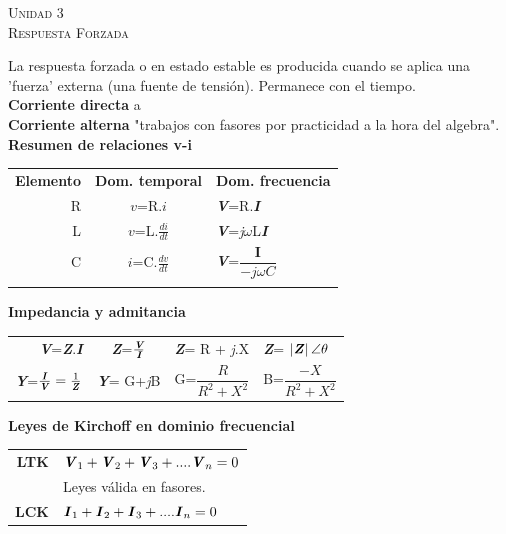 \documentclass[11pt,a4paper,twocolumn]{article}
\newcommand{\unidad}[2]{\begin{center}
		\fontsize{10}{10}\selectfont\color{gray!50!black}\scshape Unidad #1 \\
		\fontsize{14}{14}\selectfont \scshape #2
\end{center}}
\begin{document}
	\unidad{3}{Respuesta Forzada}
	
	La respuesta forzada o en estado estable  es producida cuando se aplica una 'fuerza' externa (una fuente de tensión). Permanece con el tiempo.\\
	
	\textbf{Corriente directa}
	a\\
	
	\textbf{Corriente alterna}
	"trabajos  con fasores por practicidad a la hora del algebra".\\
	
	\textbf{Resumen de relaciones v-i}
	
	\begin{tabular}{r c l}
		\hline
		\textbf{Elemento}&\textbf{Dom. temporal}&\textbf{Dom. frecuencia}\\
		R & $\mathit{v}$=R.$\mathit{i}$& \textbf{\textit{V}}=R.\textbf{\textit{I}}\\
		L & $\mathit{v}$=L.$\tfrac{di}{dt}$& \textbf{\textit{V}}=\textit{j$\omega$}L\textbf{\textit{I}}\\
		C & $\mathit{i}$=C.$\tfrac{dv}{dt}$& \textbf{\textit{V}}=$\dfrac{\textbf{I}}{-\textit{j}\omega C}$\\
		\hline\\
	\end{tabular}


	\textbf{Impedancia y admitancia}
	\begin{center}
	\begin{tabular}{r c c l }
		 
		 \textbf{\textit{V}}=\textbf{\textit{Z}}.\textbf{\textit{I}} & \textbf{\textit{Z}}=$\tfrac{\textit{\textbf{V}}}{\textit{\textbf{I}}}$ &	\textbf{\textit{Z}}= R + \textit{j}.X & \textbf{\textit{Z}}= $\left| \textbf{\textit{Z}} \right| \angle\theta $ \\
		\vspace{0.1cm} \textbf{\textit{Y}}=$\tfrac{\textbf{\textit{I}}}{\textbf{\textit{V}}}=\tfrac{1}{\textbf{\textit{Z}}}$& \textbf{\textit{Y}}= G+\textit{j}B& G=$\dfrac{R}{R^{2}+X^{2}}$& B=$\dfrac{-X}{R^{2}+X^{2}}$\\
		
	\end{tabular}
	\end{center}
	\textbf{Leyes de Kirchoff en dominio frecuencial}
	
	\begin{center}
	\begin{tabular}{r l}
		\vspace{0.1cm} \textbf{LTK}&$\textbf{\textit{V}}_{1} +\textbf{\textit{V}}_{2} +\textbf{\textit{V}}_{3} +....\textbf{\textit{V}}_{n} = 0 $ \\
		& Leyes válida en fasores.\\
		\vspace{0.1cm} \textbf{LCK}&$\textbf{\textit{I}}_{1} +\textbf{\textit{I}}_{2} +\textbf{\textit{I}}_{3} +....\textbf{\textit{I}}_{n} = 0 $ \\
	\end{tabular}
	\end{center}
	
\end{document}
